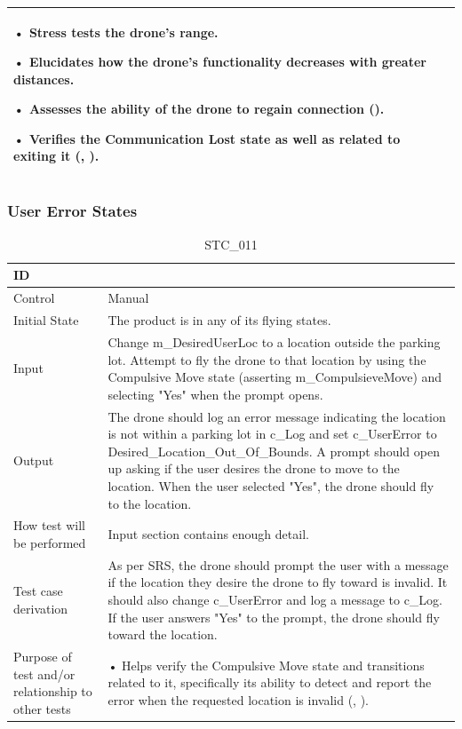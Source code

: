 \documentclass[12pt, titlepage]{article}
\begin{document}
\begin{table}[!h]
\begin{center}
\begin{tabular}{ | m{3.2cm} | m{12.2cm} | }
• Stress tests the drone's range.

• Elucidates how the drone's functionality decreases with greater distances. 

• Assesses the ability of the drone to regain connection (\nameref{SR_007}).

• Verifies the Communication Lost state as well as related to exiting it (\nameref{STA_010}, \nameref{TRANS_010}). 

\\ 
\hline
\end{tabular}
\end{center}
\end{table}

\clearpage

\subsubsection{User Error States}
\label{usererrorTests}

\begin{table}[!h]
\begin{center}
\caption {STC\_011}
\label{tab:STC_011}
\begin{tabular}{ | m{1.5cm} | m{15cm} | } 
\hline
ID & \nameref{tab:STC_011} \\ 
\hline
Control & Manual \\ 
\hline
Initial State & The product is in any of its flying states.   \\ 
\hline
Input & Change m\_DesiredUserLoc to a location outside the parking lot. Attempt to fly the drone to that location by using the Compulsive Move state (asserting m\_CompulsieveMove) and selecting "Yes" when the prompt opens.  \\ 
\hline
Output & The drone should log an error message indicating the location is not within a parking lot in  c\_Log and set c\_UserError to Desired\_Location\_Out\_Of\_Bounds. A prompt should open up asking if the user desires the drone to move to the location. When the user selected "Yes", the drone should fly to the location. \\

\hline
How test will be performed & Input section contains enough detail. \\ 
\hline
Test case derivation & As per SRS, the drone should prompt the user with a message if the location they desire the drone to fly toward is invalid. It should also change c\_UserError and log a message to c\_Log. If the user answers "Yes" to the prompt, the drone should fly toward the location.  

 \\ 
\hline
Purpose of test and/or relationship to other tests & 

• Helps verify the Compulsive Move state and transitions related to it, specifically its ability to detect and report the error when the requested location is invalid (\nameref{STA_013}, \nameref{TRANS_005}).
\\ 
\hline
\end{tabular}
\end{center}
\end{table}
\end{document}
